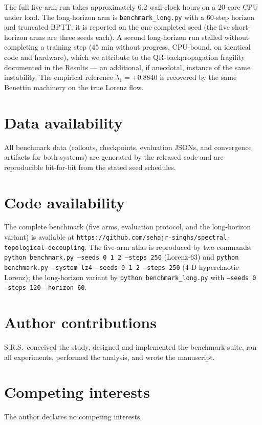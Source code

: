 \documentclass[11pt]{article}
\begin{document}
The full five-arm run takes approximately 6.2 wall-clock hours on a
20-core CPU under load. The long-horizon arm is
\texttt{benchmark\_long.py} with a 60-step horizon and truncated BPTT;
it is reported on the one completed seed (the five short-horizon arms
are three seeds each). A second long-horizon run stalled without
completing a training step (45 min without progress, CPU-bound, on
identical code and hardware), which we attribute to the
QR-backpropagation fragility documented in the Results --- an
additional, if anecdotal, instance of the same instability. The
empirical reference $\lambda_1=+0.8840$ is recovered by the same
Benettin machinery on the true Lorenz flow.

\section*{Data availability}
\begin{sloppypar}
All benchmark data (rollouts, checkpoints, evaluation JSONs, and
convergence artifacts for both systems) are generated by the released
code and are reproducible bit-for-bit from the stated seed schedules.
\end{sloppypar}

\section*{Code availability}
\begin{sloppypar}
The complete benchmark (five arms, evaluation protocol, and the
long-horizon variant) is available at
\texttt{https://github.com/sehajr-singhs/spectral-topological-decoupling}.
The five-arm atlas is reproduced by two commands: \texttt{python
benchmark.py --seeds 0 1 2 --steps 250} (Lorenz-63) and
\texttt{python benchmark.py --system lz4 --seeds 0 1 2 --steps
250} (4-D hyperchaotic Lorenz); the long-horizon variant by
\texttt{python benchmark\_long.py} with \texttt{--seeds 0 --steps
120 --horizon 60}.
\end{sloppypar}

\section*{Author contributions}
S.R.S.\ conceived the study, designed and implemented the benchmark
suite, ran all experiments, performed the analysis, and wrote the
manuscript.

\section*{Competing interests}
The author declares no competing interests.
\end{document}
